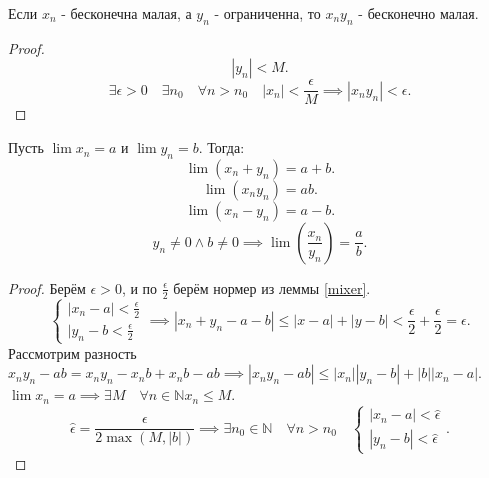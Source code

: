 \documentclass[11pt, oneside]{article}   	%
\begin{document}
        \begin{dlemma}
            Если $x_n$ - бесконечна малая, а  $y_n$ - ограниченна, то  $x_ny_n$ - бесконечно малая.
             \begin{proof}
                 \[ |y_n| < M .\]
                 \[ \exists{\epsilon > 0}\quad \exists{n_0}\quad \forall{n > n_0}\quad |x_n| < \frac{\epsilon}{M} \implies |x_ny_n| < \epsilon .\] 
            \end{proof}
        \end{dlemma}
        \begin{theorem}
            Пусть $\lim x_n=a$ и  $\lim y_n = b$. Тогда:
            \[ \lim \left( x_n+y_n \right) =a+b .\]
            \[ \lim \left( x_ny_n \right) =ab .\]
            \[ \lim\left( x_n-y_n \right)=a-b  .\]
            \[ y_n \neq 0\land b\neq 0 \implies \lim\left( \frac{x_n}{y_n} \right) = \frac{a}{b} .\]
            \begin{proof}
                Берём $\epsilon > 0$, и по  $\frac{\epsilon}{2}$ берём нормер из леммы \ref{mixer}.
                \[ 
                    \begin{cases}
                        |x_n-a|<\frac{\epsilon}{2}\\
                        |y_n-b<\frac{\epsilon}{2}
                    \end{cases}
                \implies |x_n+y_n-a-b|\le |x-a|+|y-b|<\frac{\epsilon}{2}+\frac{\epsilon}{2}=\epsilon.\]
            Рассмотрим разность $x_ny_n-ab = x_ny_n-x_nb+x_nb-ab \implies |x_ny_n-ab|\le |x_n| |y_n-b|+|b| |x_n-a|$.\\
            $\lim x_n = a \implies \exists{M}\quad \forall{n \in \mathbb{N}} x_n \le  M$.
            \[ \hat{\epsilon} = \frac{\epsilon}{2\max\left( M, |b| \right) } \implies \exists{n_0 \in \mathbb{N}}\quad \forall{n > n_0}\quad \begin{cases}
                |x_n-a| < \hat{\epsilon}\\
                |y_n-b| < \hat{\epsilon}
            \end{cases}.\] 
            \end{proof} 
        \end{theorem}
\end{document}

